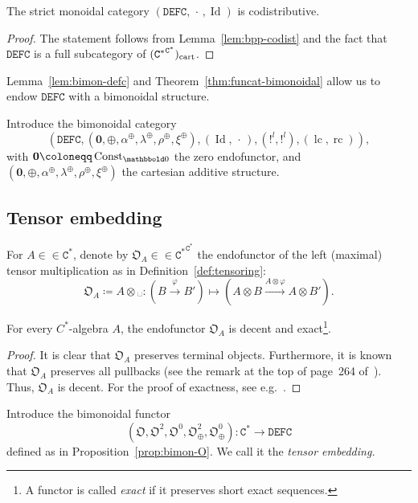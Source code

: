 \documentclass[10pt]{simplearticle}
\newcommand{\Const}{\operatorname{Const}}
\newcommand{\Id}{\operatorname{Id}}
\newcommand{\DEFC}{\mathbb{\mathtt{DEFC}}}
\newcommand{\Cstar}{\mathtt{C^{*}}}
\newcommand{\EFC}{\Cstar^{\Cstar}}
\newcommand{\mmph}{\text{{␣}}}
\newcommand{\au}{\alpha^{\oplus}}
\newcommand{\lu}{\lambda^{\oplus}}
\newcommand{\ru}{\rho^{\oplus}}
\newcommand{\bzero}{\boldsymbol{0}}
\newcommand{\bbzero}{\mathbbold0}
\newcommand{\bpp}[1]{(#1^{#1})_{\textup{cart}}}
\newcommand{\Terminal}{\boldsymbol{!}}
\newcommand{\rc}{\operatorname{rc}}
\newcommand{\lc}{\operatorname{lc}}
\newcommand{\singledot}{\,\cdot\,}
\begin{document}
\begin{lem}\label{lem:bimon-defc}
The strict monoidal category $(\DEFC,\singledot,\Id)$
is codistributive.
\end{lem}

\begin{proof}
The statement follows from Lemma~\ref{lem:bpp-codist} and the fact
that $\DEFC$ is a full subcategory of $\bpp{\Cstar}$.
\end{proof}

Lemma~\ref{lem:bimon-defc} and Theorem~\ref{thm:funcat-bimonoidal}
allow us to endow $\DEFC$ with a bimonoidal structure.
\begin{defn}\label{def:bimon-defc}
Introduce the bimonoidal category
\[
(\DEFC,(\bzero,\oplus,\au,\lu,\ru,\xi^{\oplus}),(\Id,\singledot),(\Terminal^{l},\Terminal^{l}),(\lc,\rc)),
\]
with $\bzero\coloneqq\Const_{\bbzero}$ the zero endofunctor, and
$(\bzero,\oplus,\au,\lu,\ru,\xi^{\oplus})$ the cartesian additive
structure.
\end{defn}

\subsection{Tensor embedding}

For $A\in\in\Cstar$, denote by $\mathfrak{O}_{A}\in\in\EFC$ the
endofunctor of the left (maximal) tensor multiplication as in Definition~\ref{def:tensoring}:
\[
\mathfrak{O}_{A}\coloneqq A\otimes\mmph\colon(B\xrightarrow{\varphi}B')\mapsto(A\otimes B\xrightarrow{A\otimes\varphi}A\otimes B').
\]

\begin{prop}\label{prop:O-decent}
For every $C^{*}$-algebra $A$, the endofunctor
$\mathfrak{O}_{A}$ is decent and
exact\footnote{A functor is called \emph{exact} if it preserves short exact sequences.}.
\end{prop}

\begin{proof}
It is clear that $\mathfrak{O}_{A}$ preserves terminal objects. Furthermore,
it is known that $\mathfrak{O}_{A}$ preserves all pullbacks (see
the remark at the top of page~264 of~\cite{Ped_pullback99}). Thus,
$\mathfrak{O}_{A}$ is decent. For the proof of exactness, see e.g.~\cite[Lemma~4.1]{GHT}.
\end{proof}

\begin{defn}\label{def:bimon-C-DEFC}
Introduce the bimonoidal functor
\[
(\mathfrak{O},\mathfrak{O}^{2},\mathfrak{O}^{0},\mathfrak{O}^{2}_{\oplus},\mathfrak{O}^{0}_{\oplus})\colon\Cstar\to\DEFC
\]
defined as in Proposition~\ref{prop:bimon-O}. We call it the \emph{tensor
embedding.}
\end{defn}
\end{document}

